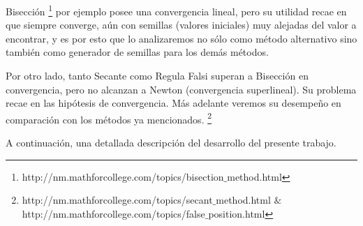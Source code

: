 Bisección \footnote{http://nm.mathforcollege.com/topics/bisection$\_$method.html} por ejemplo posee una convergencia lineal, pero su utilidad recae en que siempre converge, aún con semillas (valores iniciales) muy alejadas del valor a encontrar, y es por esto que lo analizaremos no sólo como método alternativo sino también como generador de semillas para los demás métodos.

Por otro lado, tanto Secante como Regula Falsi superan a Bisección en convergencia, pero no alcanzan a Newton (convergencia superlineal). Su problema recae en las hipótesis de convergencia. Más adelante veremos su desempeño en comparación con los métodos ya mencionados. 
\footnote{http://nm.mathforcollege.com/topics/secant$\_$method.html $\&$ http://nm.mathforcollege.com/topics/false$\_$position.html}

A continuación, una detallada descripción del desarrollo del presente trabajo.
